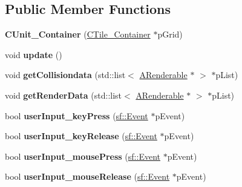 \subsection*{Public Member Functions}
\begin{DoxyCompactItemize}
\item 
\hypertarget{classCUnit__Container_af5f49693ed8b3caa01db3b04148fdce0}{{\bfseries C\-Unit\-\_\-\-Container} (\hyperlink{classCTile__Container}{C\-Tile\-\_\-\-Container} $\ast$p\-Grid)}\label{classCUnit__Container_af5f49693ed8b3caa01db3b04148fdce0}

\item 
\hypertarget{classCUnit__Container_ac9f8730abcc32d9d1d98b32667e0df61}{void {\bfseries update} ()}\label{classCUnit__Container_ac9f8730abcc32d9d1d98b32667e0df61}

\item 
\hypertarget{classCUnit__Container_ae6ad715fcd23465df512be4dc8b8b8d0}{void {\bfseries get\-Collisiondata} (std\-::list$<$ \hyperlink{classARenderable}{A\-Renderable} $\ast$ $>$ $\ast$p\-List)}\label{classCUnit__Container_ae6ad715fcd23465df512be4dc8b8b8d0}

\item 
\hypertarget{classCUnit__Container_aebf8fd00aea2b1d181b36e7cbddf5f8e}{void {\bfseries get\-Render\-Data} (std\-::list$<$ \hyperlink{classARenderable}{A\-Renderable} $\ast$ $>$ $\ast$p\-List)}\label{classCUnit__Container_aebf8fd00aea2b1d181b36e7cbddf5f8e}

\item 
\hypertarget{classCUnit__Container_a83d19fd4d473972bc2720d571c6bfb73}{bool {\bfseries user\-Input\-\_\-key\-Press} (\hyperlink{classsf_1_1Event}{sf\-::\-Event} $\ast$p\-Event)}\label{classCUnit__Container_a83d19fd4d473972bc2720d571c6bfb73}

\item 
\hypertarget{classCUnit__Container_ad716ac99e85768e9da638fa971e7f5b0}{bool {\bfseries user\-Input\-\_\-key\-Release} (\hyperlink{classsf_1_1Event}{sf\-::\-Event} $\ast$p\-Event)}\label{classCUnit__Container_ad716ac99e85768e9da638fa971e7f5b0}

\item 
\hypertarget{classCUnit__Container_a2b3a12f90500e7b67413e772ece36cb2}{bool {\bfseries user\-Input\-\_\-mouse\-Press} (\hyperlink{classsf_1_1Event}{sf\-::\-Event} $\ast$p\-Event)}\label{classCUnit__Container_a2b3a12f90500e7b67413e772ece36cb2}

\item 
\hypertarget{classCUnit__Container_a3704686b7aecda14352236aed489fc25}{bool {\bfseries user\-Input\-\_\-mouse\-Release} (\hyperlink{classsf_1_1Event}{sf\-::\-Event} $\ast$p\-Event)}\label{classCUnit__Container_a3704686b7aecda14352236aed489fc25}

\end{DoxyCompactItemize}
